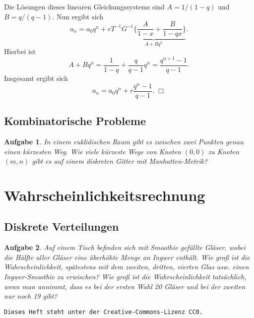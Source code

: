 \documentclass[a4paper,10pt,fleqn,twoside]{scrartcl}
\numberwithin{equation}{section}
\theoremstyle{Aufgabe}
\newtheorem{Aufgabe}{\sffamily Aufgabe}[section]
\begin{document}
Die Lösungen dieses linearen Gleichungssystems
sind $A=1/(1-q)$ und $B=q/(q-1)$. Nun ergibt sich
\[ a_n = a_0q^n + rT^{-1} \underbrace{G^{-1}\bigg\{\frac{A}{1-x} + \frac{B}{1-qx}\bigg\}}_{A+Bq^n}.\]
Hierbei ist
\[ A+Bq^n = \frac{1}{1-q}+\frac{q}{q-1}q^n = \frac{q^{n+1}-1}{q-1}.\]
Insgesamt ergibt sich
\[ a_n = a_0q^n + r\frac{q^n-1}{q-1}.\;\Box\]

\subsection{Kombinatorische Probleme}
\begin{Aufgabe}
In einem euklidischen Raum gibt es zwischen zwei Punkten genau einen
kürzesten Weg. Wie viele kürzeste Wege von Knoten $(0,0)$ zu Knoten
$(m,n)$ gibt es auf einem diskreten Gitter mit Manhatten-Metrik?
\end{Aufgabe}

\section{Wahrscheinlichkeitsrechnung}
\subsection{Diskrete Verteilungen}
\begin{Aufgabe}
Auf einem Tisch befinden sich mit Smoothie gefüllte Gläser, wobei
die Hälfte aller Gläser eine überhöhte Menge an Ingwer enthält.
Wie groß ist die Wahrscheinlichkeit, spätestens mit dem zweiten,
dritten, vierten Glas usw. einen Ingwer-Smoothie zu erwischen?
Wie groß ist die Wahrscheinlichkeit tatsächlich, wenn man annimmt,
dass es bei der ersten Wahl 20 Gläser und bei der zweiten nur noch
19 gibt?
\end{Aufgabe}

\vfill\noindent
\texttt{Dieses Heft steht unter der Creative-Commons-Lizenz CC0.}
\end{document}
